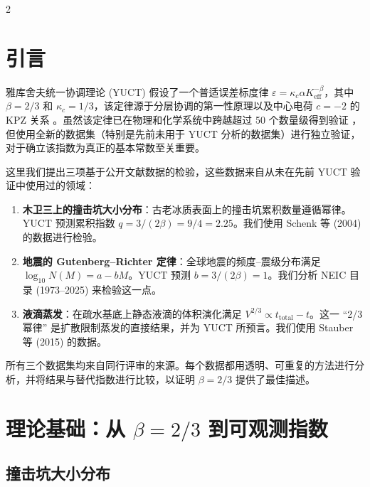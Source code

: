 \documentclass[11pt,a4paper]{article}
\newcommand{\eps}{\varepsilon}
\newcommand{\kappac}{\kappa_c}
\newcommand{\Keff}{K_{\mathrm{eff}}}
\newcommand{\betaf}{\beta}
\begin{document}
	\vspace{0.4cm}
	\vspace*{-\baselineskip}
	\begin{multicols}{2}
		
		\section{引言}
		
		雅库舍夫统一协调理论 (YUCT) 假设了一个普适误差标度律 \(\eps = \kappac \alpha \Keff^{-\betaf}\)，其中 \(\betaf = 2/3\) 和 \(\kappac = 1/3\)，该定律源于分层协调的第一性原理以及中心电荷 \(c = -2\) 的 KPZ 关系 \cite{AppendixY, AppendixL}。虽然该定律已在物理和化学系统中跨越超过 50 个数量级得到验证 \cite{AppendixC, AppendixG}，但使用全新的数据集（特别是先前未用于 YUCT 分析的数据集）进行独立验证，对于确立该指数为真正的基本常数至关重要。
		
		这里我们提出三项基于公开文献数据的检验，这些数据来自从未在先前 YUCT 验证中使用过的领域：
		
		\begin{enumerate}
			\item \textbf{木卫三上的撞击坑大小分布}：古老冰质表面上的撞击坑累积数量遵循幂律。YUCT 预测累积指数 \(q = 3/(2\betaf) = 9/4 = 2.25\)。我们使用 Schenk 等 (2004) \cite{Schenk2004} 的数据进行检验。
			\item \textbf{地震的 Gutenberg–Richter 定律}：全球地震的频度–震级分布满足 \(\log_{10} N(M) = a - bM\)。YUCT 预测 \(b = 3/(2\betaf) = 1\)。我们分析 NEIC 目录 (1973–2025) \cite{USGSNEIC} 来检验这一点。
			\item \textbf{液滴蒸发}：在疏水基底上静态液滴的体积演化满足 \(V^{2/3} \propto t_{\text{total}} - t\)。这一 “2/3 幂律” 是扩散限制蒸发的直接结果，并为 YUCT 所预言。我们使用 Stauber 等 (2015) \cite{Stauber2015} 的数据。
		\end{enumerate}
		
		所有三个数据集均来自同行评审的来源。每个数据都用透明、可重复的方法进行分析，并将结果与替代指数进行比较，以证明 \(\betaf = 2/3\) 提供了最佳描述。
		
		\section{理论基础：从 \(\betaf = 2/3\) 到可观测指数}
		
		\subsection{撞击坑大小分布}
		

\end{multicols}
\end{document}
